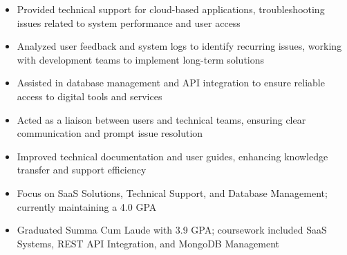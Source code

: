 \par\smallskip
\noindent
\begin{minipage}{20cm}
  \begin{minipage}{9.75cm}
    \begin{itemize}
      \item Provided technical support for cloud-based applications, troubleshooting issues related to system performance and user access
      \item Analyzed user feedback and system logs to identify recurring issues, working with development teams to implement long-term solutions
      \item Assisted in database management and API integration to ensure reliable access to digital tools and services
    \end{itemize}
  \end{minipage}
  \hfill
  \begin{minipage}{9.75cm}
    \begin{itemize}
      \item Acted as a liaison between users and technical teams, ensuring clear communication and prompt issue resolution
      \item Improved technical documentation and user guides, enhancing knowledge transfer and support efficiency
    \end{itemize}
  \end{minipage}
\end{minipage}

\begin{itemize}
  \item Focus on SaaS Solutions, Technical Support, and Database Management; currently maintaining a 4.0 GPA
\end{itemize}
\divider

\begin{itemize}
  \item Graduated Summa Cum Laude with 3.9 GPA; coursework included SaaS Systems, REST API Integration, and MongoDB Management
\end{itemize}

\noindent
\begin{minipage}{20cm}
     
    
    
\end{minipage}


